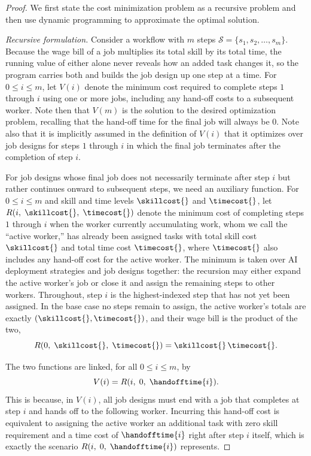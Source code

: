 \begin{proof}
We first state the cost minimization problem as a recursive problem and then use dynamic programming to approximate the optimal solution.

\emph{Recursive formulation.}
Consider a workflow with $m$ steps $\mathcal{S} = \{s_1, s_2, \ldots, s_m\}$.
Because the wage bill of a job multiplies its total skill by its total time, the running value of either alone never reveals how an added task changes it, so the program carries both and builds the job design up one step at a time.
For $0 \leq i \leq m$, let $V(i)$ denote the minimum cost required to complete steps $1$ through $i$ using one or more jobs, including any hand-off costs to a subsequent worker.
Note then that $V(m)$ is the solution to the desired optimization problem, recalling that the hand-off time for the final job will always be $0$.
Note also that it is implicitly assumed in the definition of $V(i)$ that it optimizes over job designs for steps $1$ through $i$ in which the final job terminates after the completion of step $i$.

For job designs whose final job does not necessarily terminate after step $i$ but rather continues onward to subsequent steps, we need an auxiliary function.
For $0 \leq i \leq m$ and skill and time levels $\skillcost{}$ and $\timecost{}$, let $R(i,\; \skillcost{},\; \timecost{})$ denote the minimum cost of completing steps $1$ through $i$ when the worker currently accumulating work, whom we call the ``active worker,'' has already been assigned tasks with total skill cost $\skillcost{}$ and total time cost $\timecost{}$, where $\timecost{}$ also includes any hand-off cost for the active worker.
The minimum is taken over AI deployment strategies and job designs together: the recursion may either expand the active worker's job or close it and assign the remaining steps to other workers.
Throughout, step $i$ is the highest-indexed step that has not yet been assigned.
In the base case no steps remain to assign, the active worker's totals are exactly $(\skillcost{}, \timecost{})$, and their wage bill is the product of the two,
\[ R(0,\; \skillcost{},\; \timecost{}) = \skillcost{}\,\timecost{}. \]

The two functions are linked, for all $0 \leq i \leq m$, by
\[ V(i) = R(i,\; 0,\; \handofftime{i}). \]
This is because, in $V(i)$, all job designs must end with a job that completes at step $i$ and hands off to the following worker.
Incurring this hand-off cost is equivalent to assigning the active worker an additional task with zero skill requirement and a time cost of $\handofftime{i}$ right after step $i$ itself, which is exactly the scenario $R(i,\; 0,\; \handofftime{i})$ represents.


\end{proof}
